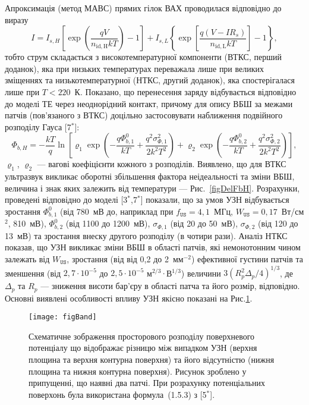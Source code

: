 Апроксимація (метод МАВС) прямих гілок ВАХ проводилася відповідно до виразу
\begin{equation}
\label{eqSDB_IV}
  I=I_{s,H}\left[\exp\left(\frac{qV}{n_\mathrm{id,H}kT}\right)-1\right]+
 I_{s,L}\left\{\exp\left[\frac{q(V-IR_s)}{n_\mathrm{id,L}kT}\right]-1\right\},
\end{equation}
тобто струм складається з високотемпературної компоненти (ВТКС, перший доданок), яка при низьких температурах переважала лише при великих зміщеннях та низькотемпературної (НТКС, другий доданок),
яка спостерігалася лише при $T<220$~К.
Показано, що перенесення заряду відбувається відповідно до моделі ТЕ через неоднорідний контакт,
причому для опису ВБШ за межами патчів (пов'язаного з ВТКС) доцільно застосовувати наближення подвійного розподілу Гауса
[7$^*$]:
\begin{equation}
\label{eqDG}
  \Phi_{b,H}=-\frac{kT}{q}\ln\left[\varrho_1\exp\left(-\frac{q\Phi_{b,1}^0}{kT}+
  \frac{q^2\sigma^2_{\Phi,1}}{2k^2T^2}\right)
   +
  \varrho_2\exp\left(-\frac{q\Phi_{b,2}^{0}}{kT}+
  \frac{q^2\sigma^2_{\Phi,2}}{2k^2T^2}\right)\right],
\end{equation}
$\varrho_1$, $\varrho_2$  --- вагові коефіцієнти кожного з розподілів.
Виявлено, що для ВТКС ультразвук викликає оборотні збільшення фактора неідеальності та зміни ВБШ,
величина і знак яких залежить від температури --- Рис.~\ref{figDelFbH}.
Розрахунки, проведені відповідно до моделі
[3$^*$,7$^*$] показали, що за умов УЗН відбувається зростання
$\Phi_{b,1}^0$ (від 780~мВ до, наприклад при $f_\mathtt{US}=4,1$~МГц, $W_\mathtt{US}=0,17$~Вт/см$^2$,  810~мВ),
$\Phi_{b,2}^0$ (від 1100 до  1200~мВ),
$\sigma_{\Phi,1}$ (від 20 до  50~мВ),
$\sigma_{\Phi,2}$ (від 120 до  13~мВ) та
зростання внеску другого розподілу (в чотири рази).
Аналіз НТКС показав, що УЗН викликає зміни ВБШ в області патчів, які немонотонним чином залежать від $W_\mathtt{US}$,
зростання (від від 0,2 до 2~мм$^{-2}$) ефективної густини патчів та зменшення (від $2,7\cdot10^{-5}$ до $2,5\cdot10^{-5}$ м$^{2/3}\cdot$В$^{1/3}$)
величини $3(R_p^2\Delta_p/4)^{1/3}$, де $\Delta_p$ та $R_p$ --- зниження висоти бар'єру в області патча та його розмір, відповідно.
Основні виявлені особливості впливу УЗН якісно показані на Рис.\ref{figBand}.



\begin{figure}
\center
\texttt{[image: figBand]}
\caption{\label{figBand}
Схематичне зображення
просторового розподілу поверхневого потенціалу
що відображає різницю між випадком УЗН (верхня площина та верхня контурна поверхня) та
його відсутністю (нижня площина та нижня контурна поверхня).
Рисунок зроблено у припущенні, що наявні два патчі.
При розрахунку потенціальних поверхонь була використана формула~(1.5.3) з
[5$^*$].
}%
\end{figure}

